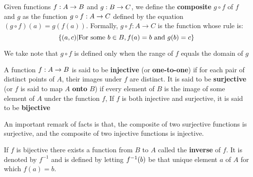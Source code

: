 \begin{defn}
	Given functions $f : A \rightarrow B$ and $g : B \rightarrow C $, we define the \textbf{composite} $ g \circ f$ of $f$ and $g$ as the function $ g \circ f : A \rightarrow C $ defined by the equation $ (g \circ f)(a) = g(f(a)) $.
	Formally, $  g \circ f: A \rightarrow C $ is the function whose rule is:
	\[ \left\lbrace (a,c) | \textrm{For some } b \in B, f(a)= b \textrm{ and } g(b) = c \right\rbrace \]
\end{defn}
We take note that $ g \circ f$ is defined only when the range of $f$ equals the domain of $g$
\begin{defn}
	A function $ f : A \rightarrow B $ is said to be \textbf{injective} (or \textbf{one-to-one}) if for each pair of distinct points of $A$, their images under $f$ are distinct. It is said to be \textbf{surjective} (or $f$ is said to map $A$ \textbf{onto} $B$) if every element of $B$ is the image of some element of $A$ under the function $f$, If $f$ is both injective and surjective, it is said to be \textbf{bijective} 
\end{defn}
An important remark of facts is that, the composite of two surjective functions is surjective, and the composite of two injective functions is injective.

If $f$ is bijective there exists a function from $B$ to $A$ called the \textbf{inverse} of $f$. It is denoted by $ f^{-1} $ and is defined by letting $ f^{-1}(b) $ be that unique element $a$ of $A$   for which $f(a) = b$. 

